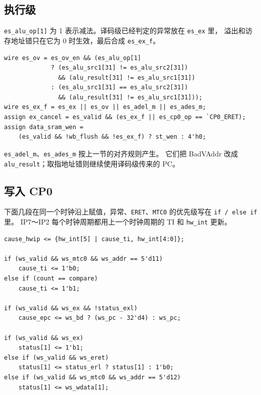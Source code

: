 \documentclass{article}
\begin{document}
\subsection{执行级}
\texttt{es\_alu\_op[1]} 为 1 表示减法。译码级已经判定的异常放在 \texttt{es\_ex} 里，
溢出和访存地址错只在它为 0 时生效，最后合成 \texttt{es\_ex\_f}。
\begin{verbatim}
wire es_ov = es_ov_en && (es_alu_op[1]
             ? (es_alu_src1[31] != es_alu_src2[31])
               && (alu_result[31] != es_alu_src1[31])
             : (es_alu_src1[31] == es_alu_src2[31])
               && (alu_result[31] != es_alu_src1[31]));
wire es_ex_f = es_ex || es_ov || es_adel_m || es_ades_m;
assign ex_cancel = es_valid && (es_ex_f || es_cp0_op == `CP0_ERET);
assign data_sram_wen =
    (es_valid && !wb_flush && !es_ex_f) ? st_wen : 4'h0;
\end{verbatim}
\texttt{es\_adel\_m}、\texttt{es\_ades\_m} 按上一节的对齐规则产生。
它们把 BadVAddr 改成 \texttt{alu\_result}；取指地址错则继续使用译码级传来的 PC。

\subsection{写入 CP0}
下面几段在同一个时钟沿上赋值，异常、\texttt{ERET}、\texttt{MTC0} 的优先级写在 \texttt{if / else if} 里。
IP7～IP2 每个时钟周期都用上一个时钟周期的 TI 和 \texttt{hw\_int} 更新。
\begin{verbatim}
cause_hwip <= {hw_int[5] | cause_ti, hw_int[4:0]};

if (ws_valid && ws_mtc0 && ws_addr == 5'd11)
    cause_ti <= 1'b0;
else if (count == compare)
    cause_ti <= 1'b1;

if (ws_valid && ws_ex && !status_exl)
    cause_epc <= ws_bd ? (ws_pc - 32'd4) : ws_pc;

if (ws_valid && ws_ex)
    status[1] <= 1'b1;
else if (ws_valid && ws_eret)
    status[1] <= status_erl ? status[1] : 1'b0;
else if (ws_valid && ws_mtc0 && ws_addr == 5'd12)
    status[1] <= ws_wdata[1];
\end{verbatim}
\end{document}
